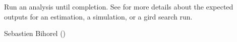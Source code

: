 %
\begin{Value}
Run an analysis until completion. See 
 for more details about the
expected outputs for an estimation, a simulation, or a gird search run.
\end{Value}
%
\begin{Author}\relax
Sebastien Bihorel ()
\end{Author}
%
\begin{SeeAlso}\relax
{}
\end{SeeAlso}
